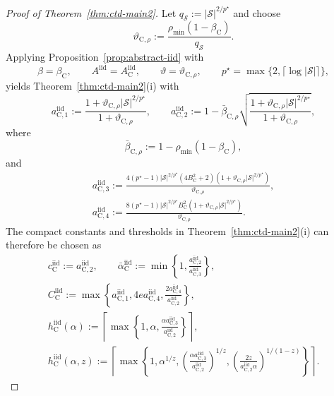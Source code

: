 \documentclass{article}
\newcommand{\X}{\mathcal{S}}
\begin{document}
\begin{proof}[Proof of Theorem~\ref{thm:ctd-main2}]
Let $q_{\X}:=\lvert\X\rvert^{2/p^\star}$ and choose
\begin{equation}
\vartheta_{\mathrm C,\rho}:=\frac{\rho_{\min}(1-\beta_{\mathrm C})}{q_{\X}}.
\end{equation}
Applying Proposition~\ref{prop:abstract-iid} with
\begin{equation}
\beta = \beta_{\mathrm C}, \qquad A^{\mathrm{iid}} = A_{\mathrm C}^{\mathrm{iid}}, \qquad \vartheta = \vartheta_{\mathrm C,\rho}, \qquad p^\star = \max\{2,\lceil \log \lvert \X \rvert \rceil\},
\end{equation}
yields Theorem~\ref{thm:ctd-main2}(i) with
\begin{equation}
a_{\mathrm C,1}^{\mathrm{iid}} := \frac{1 + \vartheta_{\mathrm C,\rho}\lvert \X \rvert^{2/p^\star}}{1+\vartheta_{\mathrm C,\rho}}, \qquad a_{\mathrm C,2}^{\mathrm{iid}} := 1-\bar\beta_{\mathrm C,\rho}\sqrt{\frac{1 + \vartheta_{\mathrm C,\rho}\lvert \X \rvert^{2/p^\star}}{1+\vartheta_{\mathrm C,\rho}}},
\end{equation}
where
\begin{equation}
\bar\beta_{\mathrm C,\rho} := 1-\rho_{\min}(1-\beta_{\mathrm C}),
\end{equation}
and
\begin{equation}
\begin{gathered}
a_{\mathrm C,3}^{\mathrm{iid}} := \frac{4(p^\star-1)\lvert \X \rvert^{2/p^\star}(4B_{\mathrm C}^2+2)(1+\vartheta_{\mathrm C,\rho}\lvert \X \rvert^{2/p^\star})}{\vartheta_{\mathrm C,\rho}},\\
a_{\mathrm C,4}^{\mathrm{iid}} := \frac{8(p^\star-1)\lvert \X \rvert^{2/p^\star}B_{\mathrm C}^2(1+\vartheta_{\mathrm C,\rho}\lvert \X \rvert^{2/p^\star})}{\vartheta_{\mathrm C,\rho}}.
\end{gathered}
\end{equation}
The compact constants and thresholds in Theorem~\ref{thm:ctd-main2}(i) can therefore be chosen as
\begin{equation}
\begin{gathered}
c_{\mathrm C}^{\mathrm{iid}}:=a_{\mathrm C,2}^{\mathrm{iid}},\qquad
\bar\alpha_{\mathrm C}^{\mathrm{iid}}:=\min\left\{1,\frac{a_{\mathrm C,2}^{\mathrm{iid}}}{a_{\mathrm C,3}^{\mathrm{iid}}}\right\},\\
C_{\mathrm C}^{\mathrm{iid}}:=\max\left\{a_{\mathrm C,1}^{\mathrm{iid}},4e a_{\mathrm C,4}^{\mathrm{iid}},\frac{2a_{\mathrm C,4}^{\mathrm{iid}}}{a_{\mathrm C,2}^{\mathrm{iid}}}\right\},\\
h_{\mathrm C}^{\mathrm{iid}}(\alpha):=\left\lceil\max\left\{1,\alpha,\frac{\alpha a_{\mathrm C,3}^{\mathrm{iid}}}{a_{\mathrm C,2}^{\mathrm{iid}}}\right\}\right\rceil,\\
h_{\mathrm C}^{\mathrm{iid}}(\alpha,z):=\left\lceil\max\left\{1,\alpha^{1/z},\left(\frac{\alpha a_{\mathrm C,3}^{\mathrm{iid}}}{a_{\mathrm C,2}^{\mathrm{iid}}}\right)^{1/z},\left(\frac{2z}{a_{\mathrm C,2}^{\mathrm{iid}}\alpha}\right)^{1/(1-z)}\right\}\right\rceil.
\end{gathered}
\end{equation}


\end{proof}
\end{document}
